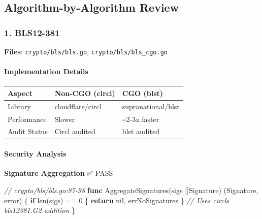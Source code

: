 \documentclass[
]{article}
\newenvironment{Shaded}{}{}
\newcommand{\BuiltInTok}[1]{\textcolor[rgb]{0.00,0.50,0.00}{#1}}
\newcommand{\CommentTok}[1]{\textcolor[rgb]{0.38,0.63,0.69}{\textit{#1}}}
\newcommand{\ControlFlowTok}[1]{\textcolor[rgb]{0.00,0.44,0.13}{\textbf{#1}}}
\newcommand{\DataTypeTok}[1]{\textcolor[rgb]{0.56,0.13,0.00}{#1}}
\newcommand{\DecValTok}[1]{\textcolor[rgb]{0.25,0.63,0.44}{#1}}
\newcommand{\KeywordTok}[1]{\textcolor[rgb]{0.00,0.44,0.13}{\textbf{#1}}}
\newcommand{\NormalTok}[1]{#1}
\newcommand{\OperatorTok}[1]{\textcolor[rgb]{0.40,0.40,0.40}{#1}}
\newcommand{\OtherTok}[1]{\textcolor[rgb]{0.00,0.44,0.13}{#1}}
\newcounter{none} %
\begin{document}
\subsection{Algorithm-by-Algorithm
Review}\label{algorithm-by-algorithm-review}

\subsubsection{1. BLS12-381}\label{1-bls12-381}

\textbf{Files}: \texttt{crypto/bls/bls.go},
\texttt{crypto/bls/bls\_cgo.go}

\paragraph{Implementation Details}\label{implementation-details}

{\def\LTcaptype{none} %
\begin{longtable}[]{@{}lll@{}}
\toprule\noalign{}
Aspect & Non-CGO (circl) & CGO (blst) \\
\midrule\noalign{}
\endhead
\bottomrule\noalign{}
\endlastfoot
Library & cloudflare/circl & supranational/blst \\
Performance & Slower & \textasciitilde2-3x faster \\
Audit Status & Circl audited & blst audited \\
\end{longtable}
}

\paragraph{Security Analysis}\label{security-analysis}

\textbf{Signature Aggregation} ✅ PASS

\begin{Shaded}
\begin{Highlighting}[]
\CommentTok{// crypto/bls/bls.go:87{-}98}
\KeywordTok{func}\NormalTok{ AggregateSignatures}\OperatorTok{(}\NormalTok{sigs }\OperatorTok{[]}\NormalTok{Signature}\OperatorTok{)} \OperatorTok{(}\NormalTok{Signature}\OperatorTok{,} \DataTypeTok{error}\OperatorTok{)} \OperatorTok{\{}
    \ControlFlowTok{if} \BuiltInTok{len}\OperatorTok{(}\NormalTok{sigs}\OperatorTok{)} \OperatorTok{==} \DecValTok{0} \OperatorTok{\{}
        \ControlFlowTok{return} \OtherTok{nil}\OperatorTok{,}\NormalTok{ errNoSignatures}
    \OperatorTok{\}}
    \CommentTok{// Uses circl\textquotesingle{}s bls12381.G2 addition}
\OperatorTok{\}}
\end{Highlighting}
\end{Shaded}
\end{document}
